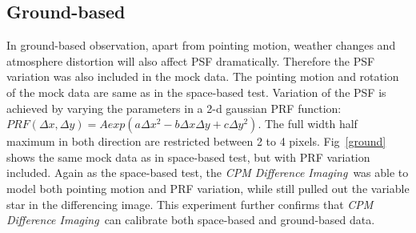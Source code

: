 \documentclass[12pt, preprint]{aastex}
\newcommand{\project}[1]{\textsl{#1}}
\newcommand{\cpmdiff}{\project{CPM Difference Imaging}}
\begin{document}
\subsection{Ground-based}
In ground-based observation, apart from pointing motion, weather changes and atmosphere distortion will also affect PSF dramatically. 
Therefore the PSF variation was also included in the mock data. 
The pointing motion and rotation of the mock data are same as in the space-based test.
Variation of the PSF is achieved by varying the parameters in a 2-d gaussian PRF function: $PRF(\Delta x, \Delta y) = A exp(a\Delta x^2-b\Delta x \Delta y+c\Delta y^2)$.
The full width half maximum in both direction are restricted between 2 to 4 pixels.
Fig~\ref{ground} shows the same mock data as in space-based test, but with PRF variation included.  
Again as the space-based test,  the \cpmdiff\ was able to model both pointing motion and PRF variation, while still pulled out the variable star in the differencing image.
This experiment further confirms that \cpmdiff\ can calibrate both space-based and ground-based data.
\end{document}
